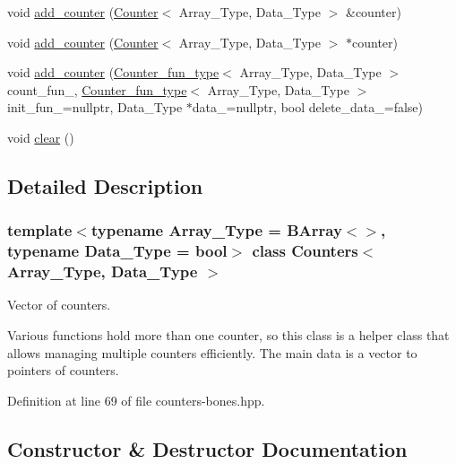 \begin{DoxyCompactItemize}
void \hyperlink{class_counters_a5b5dafc7a3e0eedae400457f69937613}{add\+\_\+counter} (\hyperlink{class_counter}{Counter}$<$ Array\+\_\+\+Type, Data\+\_\+\+Type $>$ \&counter)
\item 
void \hyperlink{class_counters_a74f054aa9ea64103c2d9f79f115777d4}{add\+\_\+counter} (\hyperlink{class_counter}{Counter}$<$ Array\+\_\+\+Type, Data\+\_\+\+Type $>$ $\ast$counter)
\item 
void \hyperlink{class_counters_a4ee47504f9c76892c6028619e6b138ee}{add\+\_\+counter} (\hyperlink{typedefs_8hpp_ac0160f52f564dea3ac033b374cffbfe7}{Counter\+\_\+fun\+\_\+type}$<$ Array\+\_\+\+Type, Data\+\_\+\+Type $>$ count\+\_\+fun\+\_\+, \hyperlink{typedefs_8hpp_ac0160f52f564dea3ac033b374cffbfe7}{Counter\+\_\+fun\+\_\+type}$<$ Array\+\_\+\+Type, Data\+\_\+\+Type $>$ init\+\_\+fun\+\_\+=nullptr, Data\+\_\+\+Type $\ast$data\+\_\+=nullptr, bool delete\+\_\+data\+\_\+=false)
\item 
void \hyperlink{class_counters_ae4635c154970a13ce88d2e982fe7dab3}{clear} ()
\end{DoxyCompactItemize}


\subsection{Detailed Description}
\subsubsection*{template$<$typename Array\+\_\+\+Type = B\+Array$<$$>$, typename Data\+\_\+\+Type = bool$>$\newline
class Counters$<$ Array\+\_\+\+Type, Data\+\_\+\+Type $>$}

Vector of counters. 

Various functions hold more than one counter, so this class is a helper class that allows managing multiple counters efficiently. The main data is a vector to pointers of counters. 

Definition at line 69 of file counters-\/bones.\+hpp.



\subsection{Constructor \& Destructor Documentation}
\mbox{\label{class_counters_a98e4efd06b3d878609911e392a8f42ce}} 
